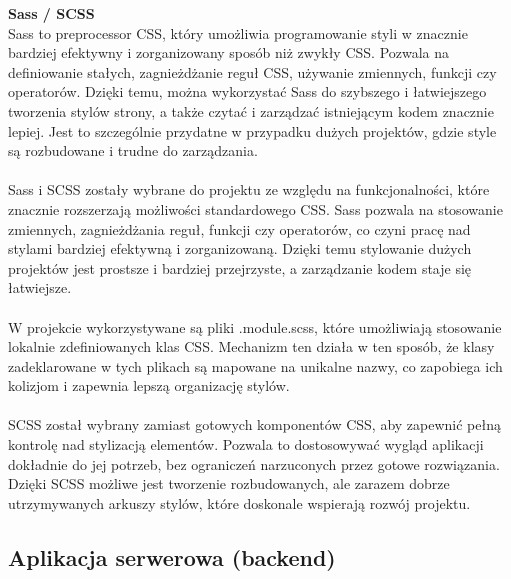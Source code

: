 \documentclass[twoside]{projektInzynierskiMS1}
\begin{document}
\noindent \textbf{Sass / SCSS}\\
Sass to preprocessor CSS, który umożliwia programowanie styli w znacznie bardziej efektywny i zorganizowany sposób niż zwykły CSS. Pozwala na definiowanie stałych, zagnieżdżanie reguł CSS, używanie zmiennych, funkcji czy operatorów. Dzięki temu, można wykorzystać Sass do szybszego i łatwiejszego tworzenia stylów strony, a także czytać i zarządzać istniejącym kodem znacznie lepiej. Jest to szczególnie przydatne w przypadku dużych projektów, gdzie style są rozbudowane i trudne do zarządzania.
\\\\
Sass i SCSS zostały wybrane do projektu ze względu na funkcjonalności, które znacznie rozszerzają możliwości standardowego CSS. Sass pozwala na stosowanie zmiennych, zagnieżdżania reguł, funkcji czy operatorów, co czyni pracę nad stylami bardziej efektywną i zorganizowaną. Dzięki temu stylowanie dużych projektów jest prostsze i bardziej przejrzyste, a zarządzanie kodem staje się łatwiejsze.
\\\\
W projekcie wykorzystywane są pliki .module.scss, które umożliwiają stosowanie lokalnie zdefiniowanych klas CSS. Mechanizm ten działa w ten sposób, że klasy zadeklarowane w tych plikach są mapowane na unikalne nazwy, co zapobiega ich kolizjom i zapewnia lepszą organizację stylów.
\\\\
SCSS został wybrany zamiast gotowych komponentów CSS, aby zapewnić pełną kontrolę nad stylizacją elementów. Pozwala to dostosowywać wygląd aplikacji dokładnie do jej potrzeb, bez ograniczeń narzuconych przez gotowe rozwiązania. Dzięki SCSS możliwe jest tworzenie rozbudowanych, ale zarazem dobrze utrzymywanych arkuszy stylów, które doskonale wspierają rozwój projektu.

\newpage

\subsection{Aplikacja serwerowa (backend)}
\end{document}
